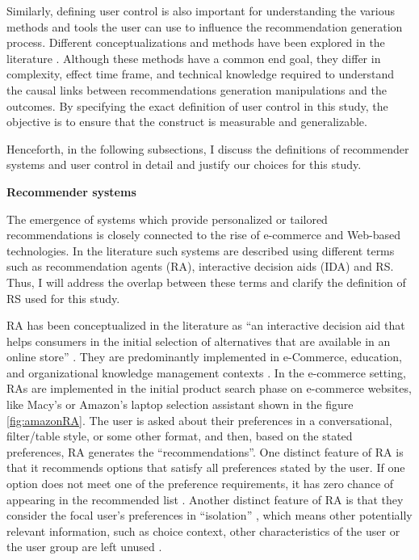 \documentclass[a4paper,12pt]{article}
\begin{document}
Similarly, defining user control is also important for understanding the various methods and tools the user can use to influence the recommendation generation process. Different conceptualizations and methods have been explored in the literature \citep{pu2012evaluating}. Although these methods have a common end goal, they differ in complexity, effect time frame, and technical knowledge required to understand the causal links between recommendations generation manipulations and the outcomes. By specifying the exact definition of user control in this study, the objective is to ensure that the construct is measurable and generalizable. 

Henceforth, in the following subsections, I discuss the definitions of recommender systems and user control in detail and justify our choices for this study.

\textbf{Recommender systems}\label{chapter:recommenderSystemsAgentsDifferentiation}

The emergence of systems which provide personalized or tailored recommendations is closely connected to the rise of e-commerce and Web-based technologies. In the literature such systems are described using different terms such as recommendation agents (RA), interactive decision aids (IDA) and RS. Thus, I will address the overlap between these terms and clarify the definition of RS used for this study.

RA has been conceptualized in the literature as ``an interactive decision aid that helps consumers in the initial selection of alternatives that are available in
an online store'' \citep{haubl2000consumer, xiao2007commerce}. They are predominantly implemented in e-Commerce, education, and organizational knowledge management contexts \citep{xiao2007commerce}. In the e-commerce setting,  RAs are implemented in the initial product search phase on e-commerce websites, like Macy's or Amazon's laptop selection assistant shown in the figure \ref{fig:amazonRA}. The user is asked about their preferences in a conversational, filter/table style, or some other format, and then, based on the stated preferences, RA generates the ``recommendations''. One distinct feature of RA is that it recommends options that satisfy all preferences stated by the user. If one option does not meet one of the preference requirements, it has zero chance of appearing in the recommended list \citep{haubl2000consumer}. Another distinct feature of RA is that they consider the focal user's preferences in ``isolation'' , which means other potentially relevant information, such as choice context, other characteristics of the user or the user group are left unused \citep{wang2008attributions}.
\end{document}
